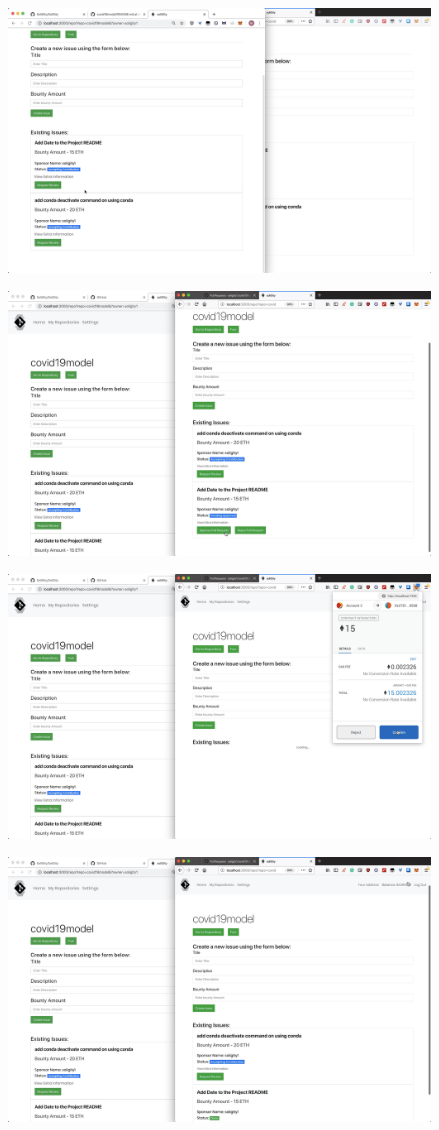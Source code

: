 \documentclass[12pt]{article}
\renewcommand{\_}{\kern-1.5pt\textunderscore\kern-1.5pt}
\begin{document}
\includegraphics[height=7cm]{graphs/39. issue_info_updated}

\includegraphics[height=7cm]{graphs/40. alice_approve_pull_request}

\includegraphics[height=7cm]{graphs/41. alice_metamask_confirm}

\includegraphics[height=7cm]{graphs/42. alice_balance_updated}
\end{document}
